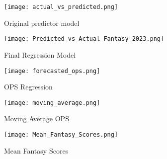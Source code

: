\documentclass[12pt, english]{article}
\begin{document}
\begin{figure}
    \centering
    \texttt{[image: actual\_vs\_predicted.png]}
    \caption{Original predictor model}
    \label{fig:Figure A}
\end{figure}

\begin{figure}
    \centering
    \texttt{[image: Predicted\_vs\_Actual\_Fantasy\_2023.png]}
    \caption{Final Regression Model}
    \label{fig:figure B}
\end{figure}

\begin{figure}
    \centering
    \texttt{[image: forecasted\_ops.png]}
    \caption{OPS Regression}
    \label{fig:figure C}
\end{figure}

\begin{figure}
    \centering
    \texttt{[image: moving\_average.png]}
    \caption{Moving Average OPS}
    \label{fig:figure D}
\end{figure}

\begin{figure}
    \centering
    \texttt{[image: Mean\_Fantasy\_Scores.png]}
    \caption{Mean Fantasy Scores}
    \label{fig:figure E}
\end{figure}
    
\end{document}
